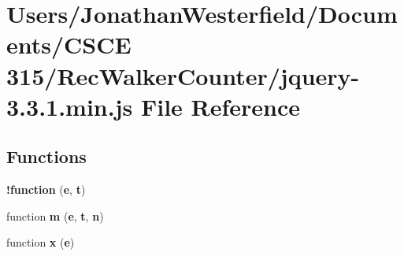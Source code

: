 \section{Users/\+Jonathan\+Westerfield/\+Documents/\+C\+S\+CE 315/\+Rec\+Walker\+Counter/jquery-\/3.3.1.min.\+js File Reference}
\label{jquery-3_83_81_8min_8js}
\subsection*{Functions}
\begin{DoxyCompactItemize}
\item 
{\bf !function} ({\bf e}, {\bf t})
\item 
function {\bf m} ({\bf e}, {\bf t}, {\bf n})
\item 
function {\bf x} ({\bf e})
\item 

\end{DoxyCompactItemize}
